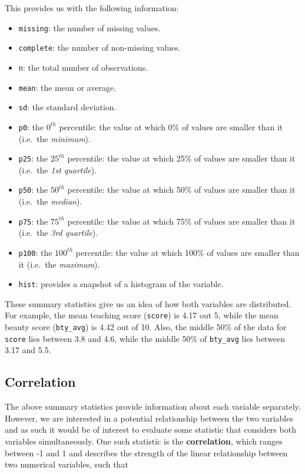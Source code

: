 \documentclass[
  letterpaper,
  DIV=11,
  numbers=noendperiod]{scrartcl}
\providecommand{\tightlist}{%
  \setlength{\itemsep}{0pt}\setlength{\parskip}{0pt}}\usepackage{longtable,booktabs,array}
\begin{document}
This provides us with the following information:

\begin{itemize}
\tightlist
\item
  \texttt{missing}: the number of missing values.
\item
  \texttt{complete}: the number of non-missing values.
\item
  \texttt{n}: the total number of observations.
\item
  \texttt{mean}: the mean or average.
\item
  \texttt{sd}: the standard deviation.
\item
  \texttt{p0}: the \(0^{th}\) percentile: the value at which 0\% of
  values are smaller than it (i.e.~the \emph{minimum}).
\item
  \texttt{p25}: the \(25^{th}\) percentile: the value at which 25\% of
  values are smaller than it (i.e.~the \emph{1st quartile}).
\item
  \texttt{p50}: the \(50^{th}\) percentile: the value at which 50\% of
  values are smaller than it (i.e.~the \emph{median}).
\item
  \texttt{p75}: the \(75^{th}\) percentile: the value at which 75\% of
  values are smaller than it (i.e.~the \emph{3rd quartile}).
\item
  \texttt{p100}: the \(100^{th}\) percentile: the value at which 100\%
  of values are smaller than it (i.e.~the \emph{maximum}).
\item
  \texttt{hist}: provides a snapshot of a histogram of the variable.
\end{itemize}

These summary statistics give us an idea of how both variables are
distributed. For example, the mean teaching score (\texttt{score}) is
4.17 out 5, while the mean beauty score (\texttt{bty\_avg}) is 4.42 out
of 10. Also, the middle 50\% of the data for \texttt{score} lies between
3.8 and 4.6, while the middle 50\% of \texttt{bty\_avg} lies between
3.17 and 5.5.

\subsection{Correlation}\label{correlation}

The above summary statistics provide information about each variable
separately. However, we are interested in a potential relationship
between the two variables and as such it would be of interest to
evaluate some statistic that considers both variables simultaneously.
One such statistic is the \textbf{correlation}, which ranges between -1
and 1 and describes the strength of the linear relationship between two
numerical variables, such that
\end{document}
